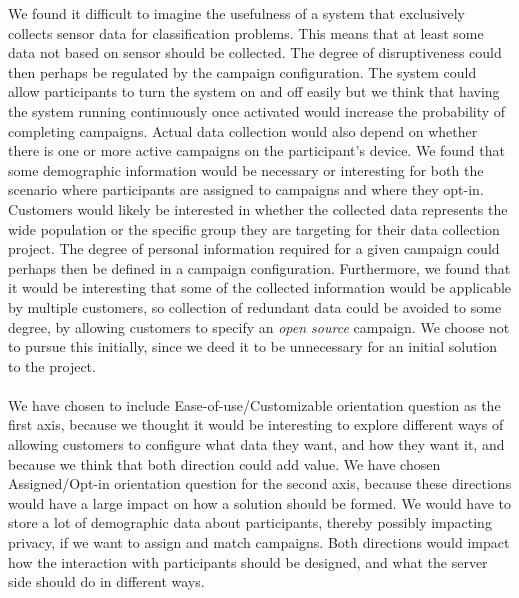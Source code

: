 We found it difficult to imagine the usefulness of a system that exclusively collects sensor data for classification problems. This means that at least some data not based on sensor should be collected. The degree of disruptiveness could then perhaps be regulated by the campaign configuration. 
The system could allow participants to turn the system on and off easily but we think that having the system running continuously once activated would increase the probability of completing campaigns. Actual data collection would also depend on whether there is one or more active campaigns on the participant's device. 
We found that some demographic information would be necessary or interesting for both the scenario where participants are assigned to campaigns and where they opt-in. Customers would likely be interested in whether the collected data represents the wide population or the specific group they are targeting for their data collection project. The degree of personal information required for a given campaign could perhaps then be defined in a campaign configuration. 
Furthermore, we found that it would be interesting that some of the collected information would be applicable by multiple customers, so collection of redundant data could be avoided to some degree, by allowing customers to specify an \emph{open source} campaign. We choose not to pursue this initially, since we deed it to be unnecessary for an initial solution to the project. 
\\\\
We have chosen to include Ease-of-use/Customizable orientation question as the first axis, because we thought it would be interesting to explore different ways of allowing customers to configure what data they want, and how they want it, and because we think that both direction could add value. 
We have chosen Assigned/Opt-in orientation question for the second axis, because these directions would have a large impact on how a solution should be formed. We would have to store a lot of demographic data about participants, thereby possibly impacting privacy, if we want to assign and match campaigns. Both directions would impact how the interaction with participants should be designed, and what the server side should do in different ways.
